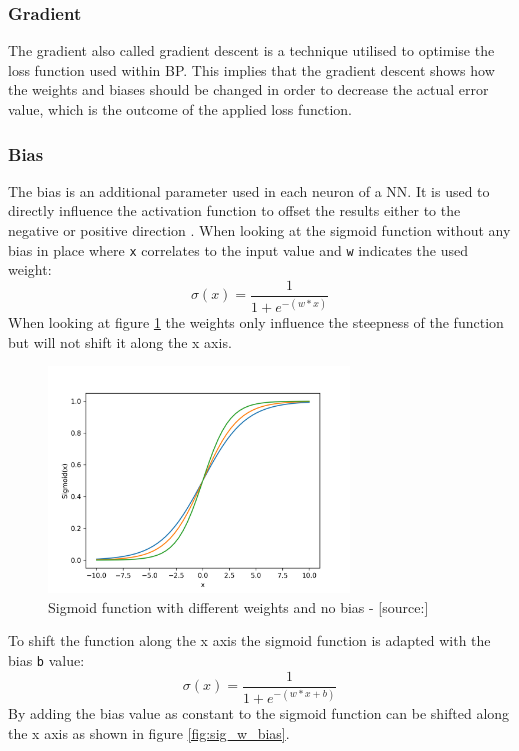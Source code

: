 \subsubsection{Gradient}
The gradient also called gradient descent is a technique utilised to optimise the loss function used within BP. 
This implies that the gradient descent shows how the weights and biases should be changed in order to decrease the actual error value, which is the outcome of the applied loss function.
 \cite{bp_basic}
\subsubsection{Bias}
The bias is an additional parameter used in each neuron of a NN. It is used to directly influence the activation function to offset the results either to the negative or positive direction \cite{bias}. When looking at the sigmoid function without any bias in place where \verb|x| correlates to the input value and \verb|w| indicates the used weight: 
\begin{equation}
 \sigma(x) = \frac{1} {1 + e^{-{(w*x)}}}
\label{eq:eq_4}
\end{equation}
When looking at figure \ref{fig:sig_wo_bias} the weights only influence the steepness of the function but will not shift it along the x axis.
\begin{figure}[H]
	\centering
		\includegraphics[width=8cm]{images/sigmoid_w_weights}
	\caption{Sigmoid function with different weights and no bias - [source:\cite{lstm_module}]}
	\label{fig:sig_wo_bias}
\end{figure}
 To shift the function along the x axis the sigmoid function is adapted with the bias \verb|b| value: 
\begin{equation}
 \sigma(x) = \frac{1} {1 + e^{-{(w*x+b)}}}
\label{eq:eq_4}
\end{equation}
By adding the bias value as constant to the sigmoid function can be shifted along the x axis as shown in figure \ref{fig:sig_w_bias}.
